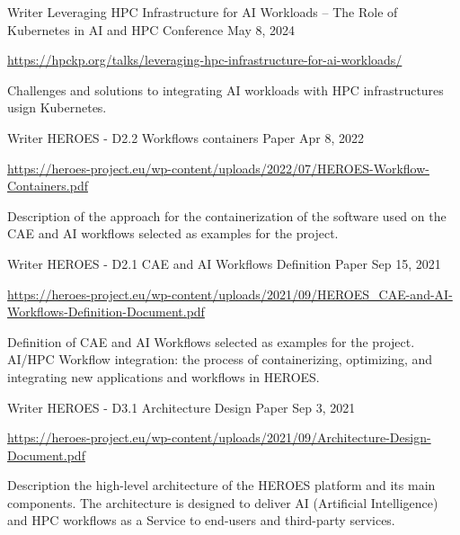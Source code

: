 
\begin{cventries}

\cventry
{Writer}
{Leveraging HPC Infrastructure for AI Workloads – The Role of Kubernetes in AI and HPC}
{Conference}
{May 8, 2024}
{
    \begin{cvitems}
    \item {\url{https://hpckp.org/talks/leveraging-hpc-infrastructure-for-ai-workloads/}}
    \item {Challenges and solutions to integrating AI workloads with HPC infrastructures usign Kubernetes.}
    \end{cvitems}
}

\cventry
{Writer}
{HEROES - D2.2 Workflows containers}
{Paper}
{Apr 8, 2022}
{
    \begin{cvitems}
    \item {\url{https://heroes-project.eu/wp-content/uploads/2022/07/HEROES-Workflow-Containers.pdf}}
    \item {Description of the approach for the containerization of the software used on the CAE and AI workflows selected as examples for the project.}
    \end{cvitems}
}
\cventry
{Writer}
{HEROES - D2.1 CAE and AI Workflows Definition}
{Paper}
{Sep 15, 2021}
{
    \begin{cvitems}
    \item {\url{https://heroes-project.eu/wp-content/uploads/2021/09/HEROES\_CAE-and-AI-Workflows-Definition-Document.pdf}}
    \item {Definition of CAE and AI Workflows selected as examples for the project. AI/HPC Workflow integration: the process of containerizing, optimizing, and integrating new applications and workflows in HEROES.}
    \end{cvitems}
}

\cventry
{Writer}
{HEROES - D3.1 Architecture Design}
{Paper}
{Sep 3, 2021}
{
    \begin{cvitems}
    \item {\url{https://heroes-project.eu/wp-content/uploads/2021/09/Architecture-Design-Document.pdf}}
    \item {Description the high-level architecture of the HEROES platform and its main components. The architecture is designed to deliver AI (Artificial Intelligence) and HPC workflows as a Service to end-users and third-party services.}
    \end{cvitems}
}
\end{cventries}